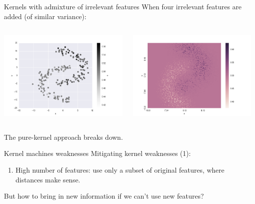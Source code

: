 \documentclass[11pt]{beamer}
\begin{document}
\begin{frame}{Kernels with admixture of irrelevant features}
When four irrelevant features are added (of similar variance):
\begin{columns}
\includegraphics[scale=0.3]{kernel_dim_scale_4.png} 

\includegraphics[scale=0.3]{kernel_dim_scale_4_hp.png} 
\end{columns}
The pure-kernel approach breaks down.
\end{frame}



\begin{frame}{Kernel machines weaknesses}
Mitigating kernel weaknesses (1):
\begin{enumerate}
\item High number of features: use only a subset of original features, where distances make sense.
\end{enumerate}
But how to bring in new information if we can't use new features?
\end{frame}
\end{document}
